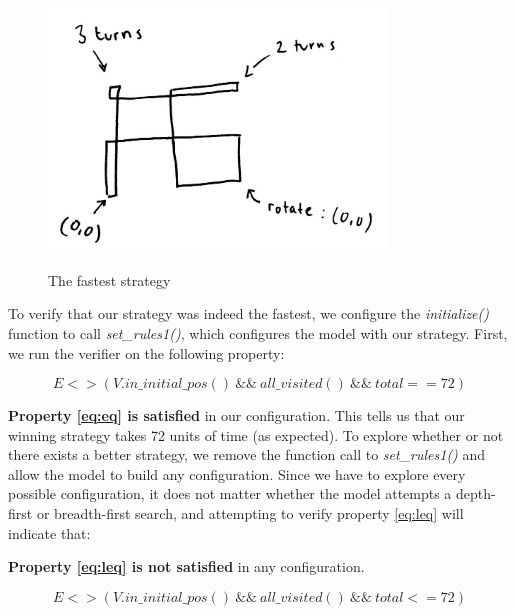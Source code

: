 \documentclass{article}
\begin{document}
\begin{figure}[h!]
	\caption{The fastest strategy}
	\centering
	\includegraphics[width=0.8\textwidth]{strategy.png}
	\label{fig:strategy}
\end{figure}

To verify that our strategy was indeed the fastest, we configure the \textit{initialize()} function to call \textit{set\_rules1()}, which configures the model with our strategy.
First, we run the verifier on the following property:

\begin{equation}
	\label{eq:eq}
	E<>(V.in\_initial\_pos() ~ \&\& ~ all\_visited() ~ \&\& ~ total ==  72)
\end{equation}

\textbf{Property \ref{eq:eq} is satisfied} in our configuration.
This tells us that our winning strategy takes 72 units of time (as expected).
To explore whether or not there exists a better strategy, we remove the function call to \textit{set\_rules1()} and allow the model to build any configuration.
Since we have to explore every possible configuration, it does not matter whether the model attempts a depth-first or breadth-first search, and attempting to verify property \ref{eq:leq} will indicate that:

\textbf{Property \ref{eq:leq} is not satisfied} in any configuration.


\begin{equation}
	\label{eq:leq}
	E<>(V.in\_initial\_pos() ~ \&\& ~ all\_visited() ~ \&\& ~ total <=  72)
\end{equation}


\end{document}

